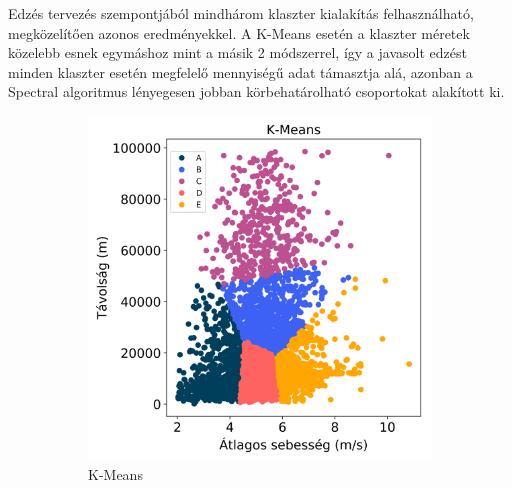 Edzés tervezés szempontjából mindhárom klaszter kialakítás felhasználható, megközelítően azonos eredményekkel. A K-Means esetén a klaszter méretek közelebb esnek egymáshoz mint a másik 2 módszerrel, így a javasolt edzést minden klaszter esetén megfelelő mennyiségű adat támasztja alá, azonban a Spectral algoritmus lényegesen jobban körbehatárolható csoportokat alakított ki.

\begin{figure}[!h]
	\centering
	\begin{subfigure}{.5\linewidth}
		\centering
		\includegraphics[width=\textwidth,keepaspectratio]{kepek/clustering/age_group_1_kmeans_results.png}
		\caption{K-Means}
		\label{subfig:clusteringAgeGroupOneKmeans}
	\end{subfigure}%
	\begin{subfigure}{.5\linewidth}
		\centering

\end{subfigure}
\end{figure}
